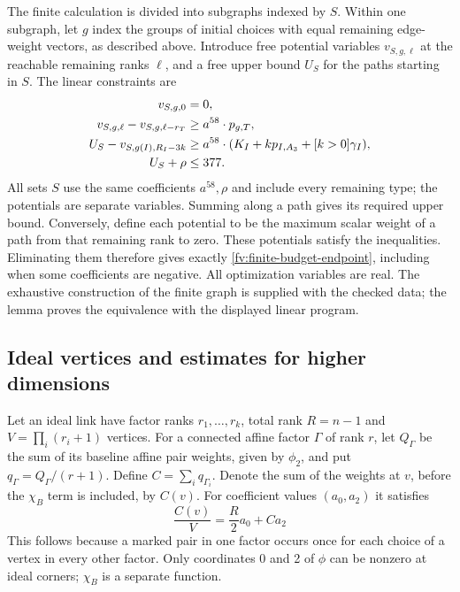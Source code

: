 \documentclass[11pt]{article}
\theoremstyle{definition}
\theoremstyle{remark}
\numberwithin{equation}{section}
\begin{document}
The finite calculation is divided into subgraphs indexed by $S$.
Within one subgraph, let $g$ index the groups of initial choices with
equal remaining edge-weight vectors, as described above. Introduce free
potential variables $v_{S,g,\ell}$ at the reachable remaining ranks
$\ell$, and a free upper bound $U_S$ for the paths starting in $S$.
The linear constraints are
\begin{align}
 v_{S,g,0}&=0,\notag\\
 v_{S,g,\ell}-v_{S,g,\ell-r_T}
                  &\ge a^{58}\cdot p_{g,T},\notag\\
 U_S-v_{S,g(I),R_I-3k}
                  &\ge a^{58}\cdot(K_I+kp_{I,A_3}+[k>0]\gamma_I),
                  \label{fv:network-lp}\\
 U_S+\rho&\le377.\notag
\end{align}
All sets $S$ use the same coefficients $a^{58},\rho$ and include
every remaining type; the potentials are separate variables. Summing
along a path gives its required upper bound. Conversely, define each
potential to be the maximum scalar weight of a path from that
remaining rank to zero. These potentials satisfy the inequalities.
Eliminating them therefore gives exactly
\eqref{fv:finite-budget-endpoint}, including when some coefficients
are negative. All optimization variables are real. The exhaustive
construction of the finite graph is supplied with the checked data;
the lemma proves the equivalence with the displayed linear program.

\subsection{Ideal vertices and estimates for higher dimensions}
\label{fv:ideal-block}

Let an ideal link have factor ranks
$r_1,\ldots,r_k$, total rank $R=n-1$ and $V=\prod_i(r_i+1)$ vertices.
For a connected affine factor $\Gamma$ of rank $r$, let $Q_\Gamma$
be the sum of its baseline affine pair weights, given by $\phi_2$,
and put
$q_\Gamma=Q_\Gamma/(r+1)$. Define $C=\sum_iq_{\Gamma_i}$.
Denote the sum of the weights at $v$, before the $\chi_B$ term is
included, by $C(v)$. For coefficient values $(a_0,a_2)$ it satisfies
\begin{equation}\label{fv:ideal-charge}
              \frac{C(v)}{V}=\frac R2a_0+Ca_2
\end{equation}
This follows because a marked
pair in one factor occurs once for each choice of a vertex in every
other factor. Only coordinates 0 and 2 of $\phi$ can be nonzero at
ideal corners; $\chi_B$ is a separate function.
\end{document}
